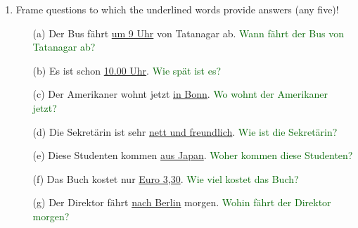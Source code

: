 \documentclass{article}
\begin{document}
\begin{enumerate}
\begin{enumerate}
    \end{enumerate}
    \item Frame questions to which the underlined words provide answers (any five)!
    \begin{enumerate}
        \item[(a)] Der Bus fährt \underline{um 9 Uhr} von Tatanagar ab. \textcolor{darkgreen}{Wann fährt der Bus von Tatanagar ab?}
        \item[(b)] Es ist schon \underline{10.00 Uhr}. \textcolor{darkgreen}{Wie spät ist es?}
        \item[(c)] Der Amerikaner wohnt jetzt \underline{in Bonn}. \textcolor{darkgreen}{Wo wohnt der Amerikaner jetzt?}
        \item[(d)] Die Sekretärin ist sehr \underline{nett und freundlich}. \textcolor{darkgreen}{Wie ist die Sekretärin?}
        \item[(e)] Diese Studenten kommen \underline{aus Japan}. \textcolor{darkgreen}{Woher kommen diese Studenten?}
        \item[(f)] Das Buch kostet nur \underline{Euro 3,30}. \textcolor{darkgreen}{Wie viel kostet das Buch?}
        \item[(g)] Der Direktor fährt \underline{nach Berlin} morgen. \textcolor{darkgreen}{Wohin fährt der Direktor morgen?}
    \end{enumerate}
\end{enumerate}
\end{document}
